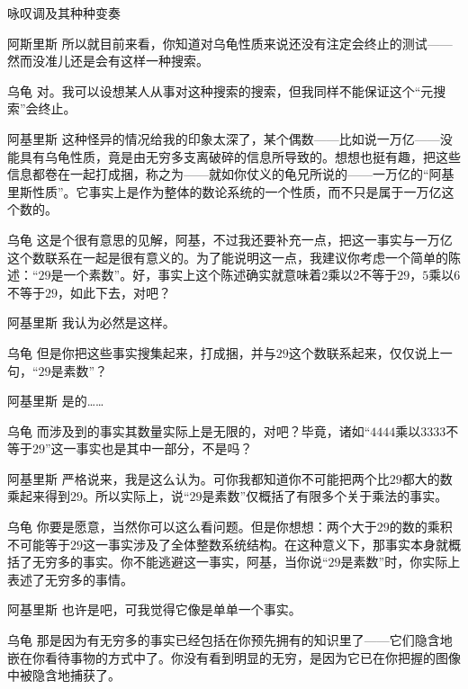 \begin{dialog}{咏叹调及其种种变奏}
\begin{dialogue}
\item[阿斯里斯]所以就目前来看，你知道对乌龟性质来说还没有注定会终止的测试——然而没准儿还是会有这样一种搜索。

\item[乌龟]对。我可以设想某人从事对这种搜索的搜索，但我同样不能保证这个“元搜索”会终止。

\item[阿基里斯]这种怪异的情况给我的印象太深了，某个偶数——比如说一万亿——没能具有乌龟性质，竟是由无穷多支离破碎的信息所导致的。想想也挺有趣，把这些信息都卷在一起打成捆，称之为——就如你仗义的龟兄所说的——一万亿的“阿基里斯性质”。它事实上是作为整体的数论系统的一个性质，而不只是属于一万亿这个数的。

\item[乌龟]这是个很有意思的见解，阿基，不过我还要补充一点，把这一事实与一万亿这个数联系在一起是很有意义的。为了能说明这一点，我建议你考虑一个简单的陈述：“$29$是一个素数”。好，事实上这个陈述确实就意味着$2$乘以$2$不等于$29$，$5$乘以$6$不等于$29$，如此下去，对吧？

\item[阿基里斯]我认为必然是这样。

\item[乌龟]但是你把这些事实搜集起来，打成捆，并与$29$这个数联系起来，仅仅说上一句，“$29$是素数”？

\item[阿基里斯]是的……

\item[乌龟]而涉及到的事实其数量实际上是无限的，对吧？毕竟，诸如“$4444$乘以$3333$不等于$29$”这一事实也是其中一部分，不是吗？

\item[阿基里斯]严格说来，我是这么认为。可你我都知道你不可能把两个比$29$都大的数乘起来得到$29$。所以实际上，说“$29$是素数”仅概括了有限多个关于乘法的事实。

\item[乌龟]你要是愿意，当然你可以这么看问题。但是你想想：两个大于$29$的数的乘积不可能等于$29$这一事实涉及了全体整数系统结构。在这种意义下，那事实本身就概括了无穷多的事实。你不能逃避这一事实，阿基，当你说“$29$是素数”时，你实际上表述了无穷多的事情。

\item[阿基里斯]也许是吧，可我觉得它像是单单一个事实。

\item[乌龟]那是因为有无穷多的事实已经包括在你预先拥有的知识里了——它们隐含地嵌在你看待事物的方式中了。你没有看到明显的无穷，是因为它已在你把握的图像中被隐含地捕获了。


\end{dialogue}
\end{dialog}
